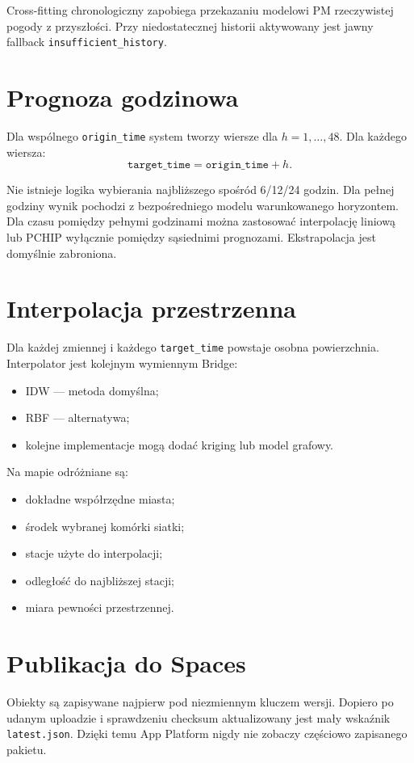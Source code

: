 \documentclass[11pt,a4paper,oneside]{article}
\begin{document}
Cross-fitting chronologiczny zapobiega przekazaniu modelowi PM rzeczywistej
pogody z przyszłości. Przy niedostatecznej historii aktywowany jest jawny
fallback \texttt{insufficient\_history}.

\section{Prognoza godzinowa}

Dla wspólnego \texttt{origin\_time} system tworzy wiersze dla
$h=1,\ldots,48$. Dla każdego wiersza:
\[
  \texttt{target\_time}=\texttt{origin\_time}+h.
\]

Nie istnieje logika wybierania najbliższego spośród 6/12/24 godzin. Dla pełnej
godziny wynik pochodzi z bezpośredniego modelu warunkowanego horyzontem. Dla
czasu pomiędzy pełnymi godzinami można zastosować interpolację liniową lub
PCHIP wyłącznie pomiędzy sąsiednimi prognozami. Ekstrapolacja jest domyślnie
zabroniona.

\section{Interpolacja przestrzenna}

Dla każdej zmiennej i każdego \texttt{target\_time} powstaje osobna
powierzchnia. Interpolator jest kolejnym wymiennym Bridge:
\begin{itemize}[nosep]
  \item IDW --- metoda domyślna;
  \item RBF --- alternatywa;
  \item kolejne implementacje mogą dodać kriging lub model grafowy.
\end{itemize}

Na mapie odróżniane są:
\begin{itemize}[nosep]
  \item dokładne współrzędne miasta;
  \item środek wybranej komórki siatki;
  \item stacje użyte do interpolacji;
  \item odległość do najbliższej stacji;
  \item miara pewności przestrzennej.
\end{itemize}

\section{Publikacja do Spaces}

Obiekty są zapisywane najpierw pod niezmiennym kluczem wersji. Dopiero po
udanym uploadzie i sprawdzeniu checksum aktualizowany jest mały wskaźnik
\texttt{latest.json}. Dzięki temu App Platform nigdy nie zobaczy częściowo
zapisanego pakietu.
\end{document}
